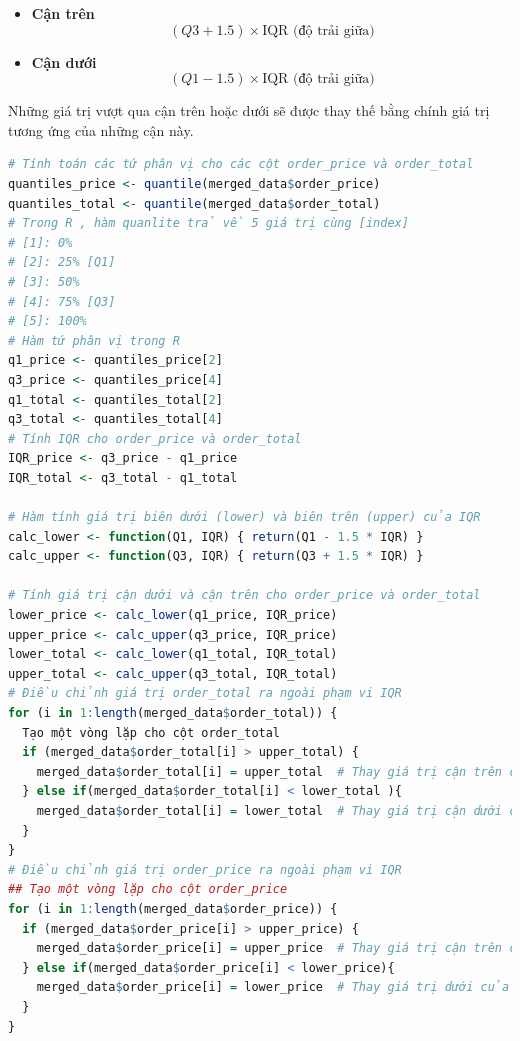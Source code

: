 \begin{itemize}
    \item \textbf{Cận trên} 
    $$( Q3 + 1.5) \times \text{IQR (độ trải giữa)}$$
    \item \textbf{Cận dưới} 
    $$( Q1 - 1.5) \times \text{IQR (độ trải giữa)}$$
\end{itemize}
Những giá trị vượt qua cận trên hoặc dưới sẽ được thay thế bằng chính giá trị tương ứng của những cận này.

\begin{lstlisting}[language=R, caption=Xử lý giá trị ngoại lai bằng phương pháp IQR]
# Tính toán các tứ phân vị cho các cột order_price và order_total
quantiles_price <- quantile(merged_data$order_price)
quantiles_total <- quantile(merged_data$order_total)
# Trong R , hàm quanlite trả về 5 giá trị cùng [index]
# [1]: 0%
# [2]: 25% [Q1]
# [3]: 50%
# [4]: 75% [Q3]
# [5]: 100%
# Hàm tứ phân vị trong R
q1_price <- quantiles_price[2]
q3_price <- quantiles_price[4]
q1_total <- quantiles_total[2]
q3_total <- quantiles_total[4]
# Tính IQR cho order_price và order_total
IQR_price <- q3_price - q1_price
IQR_total <- q3_total - q1_total

# Hàm tính giá trị biên dưới (lower) và biên trên (upper) của IQR
calc_lower <- function(Q1, IQR) { return(Q1 - 1.5 * IQR) }
calc_upper <- function(Q3, IQR) { return(Q3 + 1.5 * IQR) }

# Tính giá trị cận dưới và cận trên cho order_price và order_total
lower_price <- calc_lower(q1_price, IQR_price)
upper_price <- calc_upper(q3_price, IQR_price)
lower_total <- calc_lower(q1_total, IQR_total)
upper_total <- calc_upper(q3_total, IQR_total)
# Điều chỉnh giá trị order_total ra ngoài phạm vi IQR
for (i in 1:length(merged_data$order_total)) {
  Tạo một vòng lặp cho cột order_total
  if (merged_data$order_total[i] > upper_total) {
    merged_data$order_total[i] = upper_total  # Thay giá trị cận trên của order_total
  } else if(merged_data$order_total[i] < lower_total ){
    merged_data$order_total[i] = lower_total  # Thay giá trị cận dưới của order_total
  }
}
# Điều chỉnh giá trị order_price ra ngoài phạm vi IQR
## Tạo một vòng lặp cho cột order_price
for (i in 1:length(merged_data$order_price)) {
  if (merged_data$order_price[i] > upper_price) {
    merged_data$order_price[i] = upper_price  # Thay giá trị cận trên của order_price
  } else if(merged_data$order_price[i] < lower_price){
    merged_data$order_price[i] = lower_price  # Thay giá trị dưới của order_price
  }
}
\end{lstlisting}

